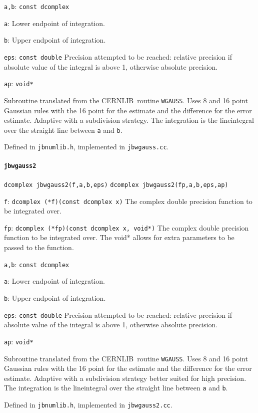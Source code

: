 \documentclass[12pt,a4paper]{article}
\newcommand{\mytt}[1]{\texttt{#1}}
\newcommand{\newfunction}[1]{\mytt{#1}\index{\mytt{#1}}}
\newcommand{\cernlib}{\textsc{CERNLIB}\cite{cernlib}}
\begin{document}
\mytt{a,b}: \mytt{const dcomplex}

\mytt{a}: Lower endpoint of integration.

\mytt{b}: Upper endpoint of integration.

\mytt{eps}: \mytt{const double} Precision attempted to be reached:
relative precision if absolute
value of the integral is above 1, otherwise absolute precision.

\mytt{ap}: \mytt{void*}

Subroutine translated from the \cernlib\ routine \mytt{WGAUSS}. Uses
8 and 16 point Gaussian rules with the 16 point for the estimate
and the difference for the error estimate. Adaptive with a subdivision strategy.
The integration is the
lineintegral over the straight line between \mytt{a} and \mytt{b}.

Defined in \mytt{jbnumlib.h}, implemented in \mytt{jbwgauss.cc}.

\paragraph{\newfunction{jbwgauss2}}

\mytt{dcomplex jbwgauss2(f,a,b,eps)}
\mytt{dcomplex jbwgauss2(fp,a,b,eps,ap)}

\mytt{f}: \mytt{dcomplex (*f)(const dcomplex x)} The complex double precision
function to be integrated over.

\mytt{fp}: \mytt{dcomplex (*fp)(const dcomplex x, void*)} The complex double precision
function to be integrated over. The void* allows for extra parameters to be passed to the function.

\mytt{a,b}: \mytt{const dcomplex}

\mytt{a}: Lower endpoint of integration.

\mytt{b}: Upper endpoint of integration.

\mytt{eps}: \mytt{const double} Precision attempted to be reached:
relative precision if absolute
value of the integral is above 1, otherwise absolute precision.

\mytt{ap}: \mytt{void*}

Subroutine translated from the \cernlib\ routine \mytt{WGAUSS}. Uses
8 and 16 point Gaussian rules with the 16 point for the estimate
and the difference for the error estimate. Adaptive with a subdivision strategy
better suited for high precision.
The integration is the
lineintegral over the straight line between \mytt{a} and \mytt{b}.

Defined in \mytt{jbnumlib.h}, implemented in \mytt{jbwgauss2.cc}.
\end{document}
